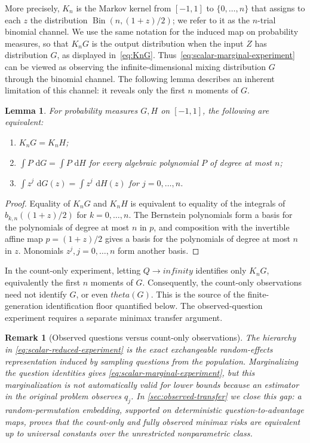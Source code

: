 \documentclass[11pt]{article}
\def\theta{theta}%
\def\infty{infinity}%
\newtheorem{lemma}[theorem]{Lemma}
\newtheorem{remark}[theorem]{Remark}
\newcommand{\Bin}{\operatorname{Bin}}
\newcommand{\dd}{\,\mathrm d}
\newcommand\aed[1]{{\color{magenta!60!black} #1}}
\newcommand\ced[1]{{\color{teal!70!black} #1}}
\begin{document}
\ced{More precisely, $K_n$ is the Markov kernel from $[-1,1]$ to $\{0,\dots,n\}$ that assigns to each $z$ the distribution $\Bin(n,(1+z)/2)$; we refer to it as the $n$-trial binomial channel.  We use the same notation for the induced map on probability measures, so that $K_nG$ is the output distribution when the input $Z$ has distribution $G$, as displayed in~\eqref{eq:KnG}.  Thus~\eqref{eq:scalar-marginal-experiment} can be viewed as observing the infinite-dimensional mixing distribution $G$ through the binomial channel.  The following lemma describes an inherent limitation of this channel: it reveals only the first $n$ moments of $G$.}

\begin{lemma}%
\label{lem:moment-equivalence}
\ced{For probability measures $G,H$ on $[-1,1]$, the following are equivalent:}
\begin{enumerate}[label=(\alph*)]
\item \ced{$K_nG=K_nH$;}
\item \ced{$\int P\,\dd G=\int P\,\dd H$ for every algebraic polynomial $P$ of degree at most $n$;}
\item \ced{$\int z^j\,\dd G(z)=\int z^j\,\dd H(z)$ for $j=0,\dots,n$.}
\end{enumerate}
\end{lemma}

\begin{proof}
Equality of $K_nG$ and $K_nH$ is equivalent to equality of the integrals of $b_{k,n}((1+z)/2)$ for $k=0,\dots,n$.  The Bernstein polynomials form a basis for the polynomials of degree at most $n$ in $p$, and composition with the invertible affine map $p=(1+z)/2$ gives a basis for the polynomials of degree at most $n$ in $z$. \aed{Monomials $z^j, j=0,\dots,n$ form another basis.}
\end{proof}

In the count-only experiment, letting $Q\to\infty$ identifies only $K_nG$, equivalently the first $n$ moments of $G$.  Consequently, the count-only observations need not identify $G$, or even $\theta(G)$.  This is the source of the finite-generation identification floor quantified below.  The observed-question experiment requires a separate minimax transfer argument.

\begin{remark}[Observed questions versus count-only observations]
The hierarchy in \eqref{eq:scalar-reduced-experiment} is the exact exchangeable random-effects representation induced by sampling questions from the population.  Marginalizing the question identities gives \eqref{eq:scalar-marginal-experiment}, but this marginalization is not automatically valid for lower bounds because an estimator in the original problem observes $q_j$.  In \cref{sec:observed-transfer} we close this gap: a random-permutation embedding, supported on deterministic question-to-advantage maps, proves that the count-only and fully observed minimax risks are equivalent up to universal constants over the unrestricted nonparametric class.
\end{remark}
\end{document}
